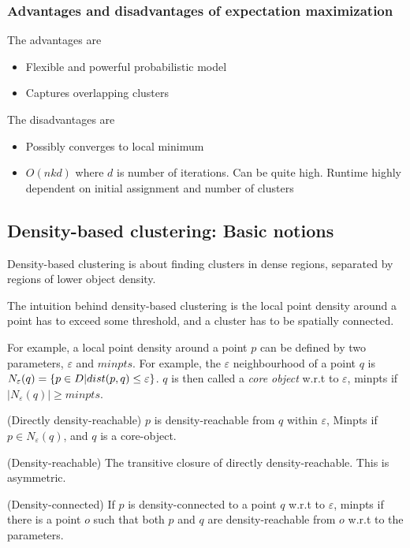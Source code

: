 \subsubsection{Advantages and disadvantages of expectation maximization}
The advantages are
\begin{itemize}
    \item Flexible and powerful probabilistic model
    \item Captures overlapping clusters
\end{itemize}
The disadvantages are
\begin{itemize}
    \item Possibly converges to local minimum
    \item $O(nkd)$ where $d$ is number of iterations. Can be quite high. Runtime highly dependent on initial assignment and number of clusters
\end{itemize}

\subsection{Density-based clustering: Basic notions}
Density-based clustering is about finding clusters in dense regions, separated by regions of lower object density.

The intuition behind density-based clustering is the local point density around a point has to exceed some threshold, and a cluster has to be spatially connected. 

For example, a local point density around a point $p$ can be defined by two parameters, $\varepsilon$ and $minpts$. For example, the $\varepsilon$ neighbourhood of a point $q$ is $N_{\varepsilon}(q) = \{p \in D | dist(p, q) \leq \varepsilon\}$. $q$ is then called a \emph{core object} w.r.t to $\varepsilon$, minpts if $|N_{\varepsilon}(q)| \geq minpts$.

\begin{defi}
(Directly density-reachable) $p$ is density-reachable from $q$ within $\varepsilon$, Minpts if $p \in N_{\varepsilon}(q)$, and $q$ is a core-object.
\end{defi}
\begin{defi}
(Density-reachable) The transitive closure of directly density-reachable. This is asymmetric.
\end{defi}
\begin{defi}
(Density-connected) If $p$ is density-connected to a point $q$ w.r.t to $\varepsilon$, minpts if there is a point $o$ such that both $p$ and $q$ are density-reachable from $o$ w.r.t to the parameters.
\end{defi}

